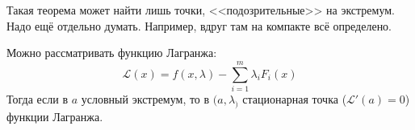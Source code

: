 \documentclass[12pt,timbord]{../../../notes}
\begin{document}
\begin{rem}
  Такая теорема может найти лишь точки, <<подозрительные>> на экстремум. Надо ещё отдельно
  думать. Например, вдруг там на компакте всё определено.
\end{rem}
\begin{rem}
  Можно рассматривать функцию Лагранжа:
  \[
    \mathcal L (x) = f(x, \lambda) - \sum_{i=1}^m \lambda_i F_i(x)
  \]
  Тогда если в $a$ условный экстремум, то в $(a,\lambda_)$ стационарная точка 
  ($\mathcal L'(a) = 0$) функции Лагранжа.
\end{rem}
\end{document}
